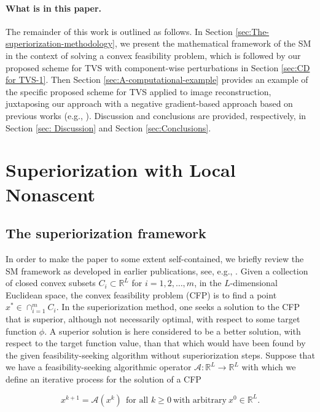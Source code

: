 \documentclass[smallextended]{svjour3}      %
\begin{document}
\paragraph{\textbf{What is in this paper}.}
The remainder of this work is outlined as follows. In Section \ref{sec:The-superiorization-methodology}, we present the mathematical framework of the SM in the context of solving a convex feasibility problem, which is followed by our proposed scheme for TVS with component-wise perturbations in Section \ref{sec:CD for TVS-1}. Then Section \ref{sec:A-computational-example} provides an example of the specific proposed scheme for TVS applied to image reconstruction, juxtaposing our approach with a negative gradient-based approach based on previous works (e.g., \cite{herman2012superiorization,censor2014projectedsubgrad}). Discussion and conclusions are provided, respectively, in Section \ref{sec: Discussion} and Section \ref{sec:Conclusions}.


\section{Superiorization with Local Nonascent \label{sec:The-superiorization-methodology}}

\subsection{The superiorization framework}
\noindent In order to make the paper to some extent self-contained, we briefly review the SM framework as developed in earlier publications, see, e.g., \cite{censor2015weakstrong,censor2010perturbation,censor2014projectedsubgrad,strictfejer,herman2012superiorization}. Given a collection of closed convex subsets $C_{i}\subset\mathbb{R}^{L}$ for $i=1,2,\ldots,m$, in the $L$-dimensional Euclidean space, the convex feasibility problem (CFP) is to find a point $x^{*}\in\cap_{i=1}^{m}C_{i}$. In the superiorization method, one seeks a solution to the CFP that is superior, although not necessarily optimal, with respect to some target function $\phi$. A superior solution is here considered to be a better solution, with respect to the target function value, than that which would have been found by the given feasibility-seeking algorithm without superiorization steps. Suppose that we have a feasibility-seeking algorithmic operator $\mathcal{A}:\mathbb{R}^{L}\rightarrow\mathbb{R}^{L}$ with which we define an iterative process for the solution of a CFP

\begin{equation}
x^{k+1}=\mathcal{A}(x^{k})\ \ \mbox{for all }k\geq0\ \mbox{with arbitrary}\ x^{0}\in\mathbb{R}^{L}.
\end{equation}
\end{document}

